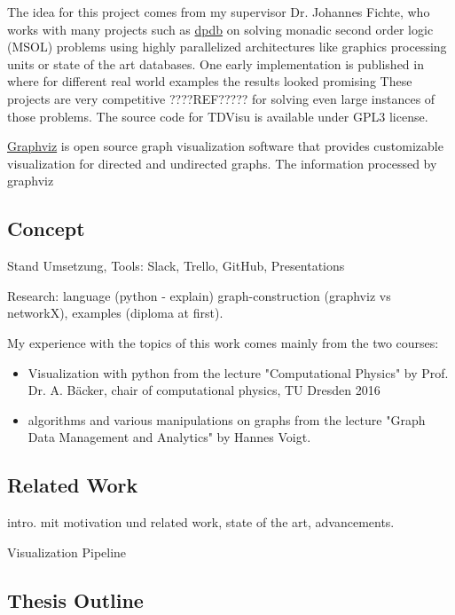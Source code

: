 \documentclass[a4paper, 12pt]{scrartcl}
\begin{document}
The idea for this project comes from my supervisor Dr. Johannes Fichte, who works with many projects such as \href{https://github.com/hmarkus/dp_on_dbs}{dpdb} on solving monadic second order logic (MSOL\cite{Courcelle2012}) problems using highly parallelized architectures like graphics processing units or state of the art databases.
One early implementation is published in \cite{evaluationMSO} where for different real world examples the results looked promising
These projects are very competitive ????REF????? for solving even large instances of those problems.
The source code for TDVisu is available under GPL3 license.

\href{https://graphviz.org/}{Graphviz} is open source graph visualization software that provides
customizable visualization for directed and undirected graphs.
The information processed by graphviz 

\subsection{Concept}

Stand Umsetzung, Tools: Slack, Trello, GitHub, Presentations

Research: language (python - explain) graph-construction (graphviz vs networkX), examples (diploma at first). 

My experience with the topics of this work comes mainly from the two courses:
\begin{itemize}
	\item Visualization with python from the lecture "Computational Physics" by Prof. Dr. A. Bäcker,
	chair of computational physics, TU Dresden 2016
	\item algorithms and various manipulations on graphs from the lecture "Graph Data Management and Analytics" by Hannes Voigt. \cite{VLGDMA}
\end{itemize}




\subsection{Related Work}
intro. mit motivation und related work, state of the art, advancements.

Visualization Pipeline
\subsection{Thesis Outline}
\end{document}
